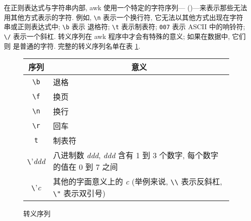 在正则表达式与字符串内部, awk 使用一个特定的字符序列---{}
(){}---来表示那些无法用其他方式表示的字符. 例如,
\verb'\n'
表示一个换行符, 它无法以其他方式出现在字符串或正则表达式中; \verb'\b' 表示
退格符; \verb'\t' 表示制表符; \verb'007' 表示 ASCII 中的响铃符; \verb'\/'
表示一个斜杠. 转义序列在 awk 程序中才会有特殊的意义; 如果在数据中, 它们则
是普通的字符. 完整的转义序列名单在表 \ref{tbl:escape_sequences}.
\begin{figure}[ht]
\captionsetup{type=table}
\caption{转义序列}
\label{tbl:escape_sequences}
\begin{center}
\begin{tabular}{c|l}
    \hline
    \hline
    序列        &  \multicolumn{1}{c}{意义}  \\
    \hline
    \verb'\b'   & 退格  \\
    \verb'\f'   & 换页  \\
    \verb'\n'   & 换行 \\
    \verb'\r'   & 回车 \\
    \verb't'    & 制表符    \\
    \verb'\'\textit{ddd} & 八进制数 \textit{ddd}, \textit{ddd}
        含有 1 到 3 个数字, 每个数字的值在 0 到 7 之间 \\
    \verb'\'\textit{c} & 其他的字面意义上的 \textit{c}
        (举例来说, \verb'\\' 表示反斜杠, \verb'\"' 表示双引号) \\
    \hline
\end{tabular}
\end{center}
\end{figure}

